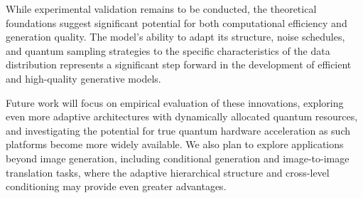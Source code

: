 \documentclass[10pt,twocolumn,letterpaper]{article}
\begin{document}
While experimental validation remains to be conducted, the theoretical foundations suggest significant potential for both computational efficiency and generation quality. The model's ability to adapt its structure, noise schedules, and quantum sampling strategies to the specific characteristics of the data distribution represents a significant step forward in the development of efficient and high-quality generative models.

Future work will focus on empirical evaluation of these innovations, exploring even more adaptive architectures with dynamically allocated quantum resources, and investigating the potential for true quantum hardware acceleration as such platforms become more widely available. We also plan to explore applications beyond image generation, including conditional generation and image-to-image translation tasks, where the adaptive hierarchical structure and cross-level conditioning may provide even greater advantages.
\end{document}
